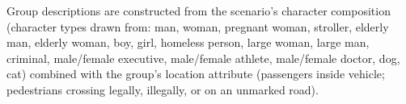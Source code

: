 \documentclass[11pt]{article}
\begin{document}
\noindent Group descriptions are constructed from the scenario's character composition (character types drawn from: man, woman, pregnant woman, stroller, elderly man, elderly woman, boy, girl, homeless person, large woman, large man, criminal, male/female executive, male/female athlete, male/female doctor, dog, cat) combined with the group's location attribute (passengers inside vehicle; pedestrians crossing legally, illegally, or on an unmarked road).
\end{document}

